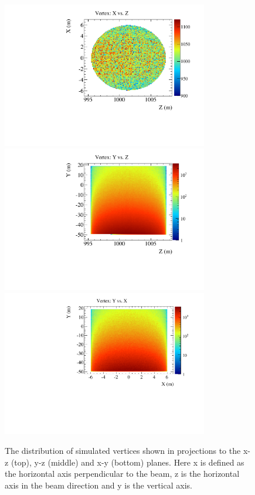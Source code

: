 \begin {figure}[htp]
  \begin{center}
    \includegraphics[width=9cm]{figures/vertex_xz.pdf}
    \includegraphics[width=9cm]{figures/vertex_yz.pdf}
    \includegraphics[width=9cm]{figures/vertex_xy.pdf}
    \caption{The distribution of simulated vertices shown in projections to the x-z (top), y-z (middle) and x-y (bottom) planes.  Here
    x is defined as the horizontal axis perpendicular to the beam, z is the horizontal axis in the beam direction and y is the vertical axis. }
    \label{fig:nu_vertex}
  \end{center}
\end {figure}  

